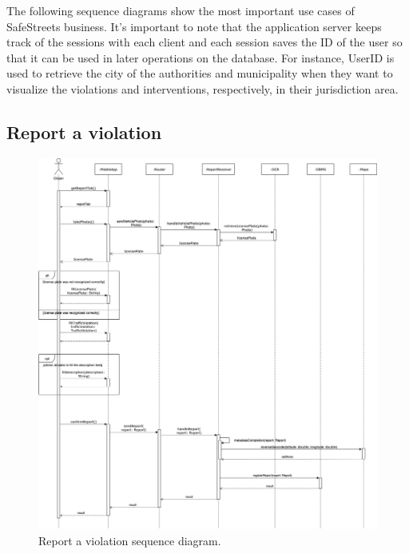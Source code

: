 The following sequence diagrams show the most important use cases of SafeStreets business. It's important to note that the application server keeps track of the sessions with each client and each session saves the ID of the user so that it can be used in later operations on the database. For instance, UserID is used to retrieve the city of the authorities and municipality when they want to visualize the violations and interventions, respectively, in their jurisdiction area.
\subsection{Report a violation}
\begin{figure}[H]
	\centering
	\includegraphics[width=\linewidth]{Images/SequenceDiagramReportViolation}
	\caption{Report a violation sequence diagram.}
\end{figure}

